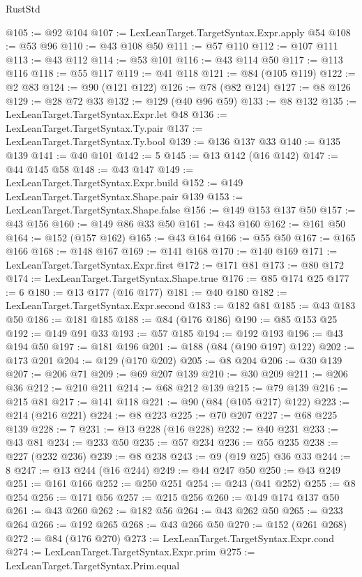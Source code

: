 \begin{lexlean}{RustStd}
\begin{coremodule}
{\begin{coremodule}
{{{{{{{{{{{{{{@105 := @92 @104
@107 := LexLeanTarget.TargetSyntax.Expr.apply @54
@108 := @53 @96
@110 := @43 @108 @50
@111 := @57 @110
@112 := @107 @111
@113 := @43 @112
@114 := @53 @101
@116 := @43 @114 @50
@117 := @113 @116
@118 := @55 @117
@119 := @41 @118
@121 := @84 (@105 @119)
@122 := @2 @83
@124 := @90 (@121 @122)
@126 := @78 (@82 @124)
@127 := @8 @126
@129 := @28 @72 @33
@132 := @129 (@40 @96 @59)
@133 := @8 @132
@135 := LexLeanTarget.TargetSyntax.Expr.let @48
@136 := LexLeanTarget.TargetSyntax.Ty.pair
@137 := LexLeanTarget.TargetSyntax.Ty.bool
@139 := @136 @137 @33
@140 := @135 @139
@141 := @40 @101
@142 := 5
@145 := @13 @142 (@16 @142)
@147 := @44 @145 @58
@148 := @43 @147
@149 := LexLeanTarget.TargetSyntax.Expr.build
@152 := @149 LexLeanTarget.TargetSyntax.Shape.pair @139
@153 := LexLeanTarget.TargetSyntax.Shape.false
@156 := @149 @153 @137 @50
@157 := @43 @156
@160 := @149 @86 @33 @50
@161 := @43 @160
@162 := @161 @50
@164 := @152 (@157 @162)
@165 := @43 @164
@166 := @55 @50
@167 := @165 @166
@168 := @148 @167
@169 := @141 @168
@170 := @140 @169
@171 := LexLeanTarget.TargetSyntax.Expr.first
@172 := @171 @81
@173 := @80 @172
@174 := LexLeanTarget.TargetSyntax.Shape.true
@176 := @85 @174 @25
@177 := 6
@180 := @13 @177 (@16 @177)
@181 := @40 @180
@182 := LexLeanTarget.TargetSyntax.Expr.second
@183 := @182 @81
@185 := @43 @183 @50
@186 := @181 @185
@188 := @84 (@176 @186)
@190 := @85 @153 @25
@192 := @149 @91 @33
@193 := @57 @185
@194 := @192 @193
@196 := @43 @194 @50
@197 := @181 @196
@201 := @188 (@84 (@190 @197) @122)
@202 := @173 @201
@204 := @129 (@170 @202)
@205 := @8 @204
@206 := @30 @139
@207 := @206 @71
@209 := @69 @207 @139
@210 := @30 @209
@211 := @206 @36
@212 := @210 @211
@214 := @68 @212 @139
@215 := @79 @139
@216 := @215 @81
@217 := @141 @118
@221 := @90 (@84 (@105 @217) @122)
@223 := @214 (@216 @221)
@224 := @8 @223
@225 := @70 @207
@227 := @68 @225 @139
@228 := 7
@231 := @13 @228 (@16 @228)
@232 := @40 @231
@233 := @43 @81
@234 := @233 @50
@235 := @57 @234
@236 := @55 @235
@238 := @227 (@232 @236)
@239 := @8 @238
@243 := @9 (@19 @25) @36 @33
@244 := 8
@247 := @13 @244 (@16 @244)
@249 := @44 @247 @50
@250 := @43 @249
@251 := @161 @166
@252 := @250 @251
@254 := @243 (@41 @252)
@255 := @8 @254
@256 := @171 @56
@257 := @215 @256
@260 := @149 @174 @137 @50
@261 := @43 @260
@262 := @182 @56
@264 := @43 @262 @50
@265 := @233 @264
@266 := @192 @265
@268 := @43 @266 @50
@270 := @152 (@261 @268)
@272 := @84 (@176 @270)
@273 := LexLeanTarget.TargetSyntax.Expr.cond
@274 := LexLeanTarget.TargetSyntax.Expr.prim
@275 := LexLeanTarget.TargetSyntax.Prim.equal
}}}}}}}}}}}}}}
\end{coremodule}}
\end{coremodule}
\end{lexlean}
